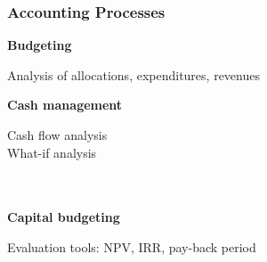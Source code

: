 \subsubsection{Accounting Processes}
\begin{adjustwidth}{2cm}{}

    \textbf{Budgeting}
        \begin{adjustwidth}{1cm}{}
            Analysis of allocations, expenditures, revenues\\
        \end{adjustwidth}
    \textbf{Cash management}
        \begin{adjustwidth}{1cm}{}
            Cash flow analysis\\
            What-if analysis\\\\\\
        \end{adjustwidth}
    \textbf{Capital budgeting}
        \begin{adjustwidth}{1cm}{}
            Evaluation tools: NPV, IRR, pay-back period\\
        \end{adjustwidth}

\end{adjustwidth}
